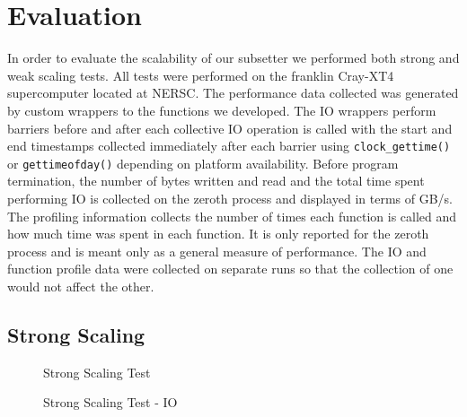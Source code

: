 \section{Evaluation}
\label{section:evaluation}

In order to evaluate the scalability of our subsetter we performed both strong
and weak scaling tests.  All tests were performed on the franklin Cray-XT4
supercomputer\cite{franklin} located at NERSC\cite{NERSC}.  The performance
data collected was generated by custom wrappers to the functions we developed.
The IO wrappers perform barriers before and after each collective IO operation
is called with the start and end timestamps collected immediately after each
barrier using \verb=clock_gettime()= or \verb=gettimeofday()= depending on
platform availability.  Before program termination, the number of bytes
written and read and the total time spent performing IO is collected on the
zeroth process and displayed in terms of GB/s.  The profiling information
collects the number of times each function is called and how much time was
spent in each function.  It is only reported for the zeroth process and is
meant only as a general measure of performance.  The IO and function profile
data were collected on separate runs so that the collection of one would not
affect the other.

\subsection{Strong Scaling}

\begin{figure}[!t]
\center
\resizebox{3.5in}{!}{

}
\caption{Strong Scaling Test}
\label{fig:strong}
\end{figure}

\begin{figure}[!t]
\center
\resizebox{3.5in}{!}{

}
\caption{Strong Scaling Test - IO}
\label{fig:strong_io}
\end{figure}

